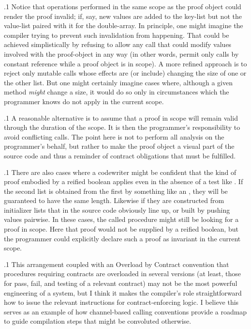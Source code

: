 \documentclass[11pt, twocolumn]{article}
\begin{document}
\p.1{%
Notice that operations performed in the same scope as
the proof object could render the proof invalid;
if, say, new values are added to the key-list but not
the value-list paired with it for the double-array. In
principle, one might imagine the compiler trying to
prevent such invalidation from happening. That could
be achieved simplistically by refusing to allow
any call that could modify values involved with the
proof-object in any way (in other words, permit
only calls by constant reference while a proof object
is in scope). A more refined approach is to reject
only mutable calls whose effects are (or include)
changing the size of one or the other list. But one
might certainly imagine cases where, although a given
method \textit{might} change a size, it would do so
only in circumstances which the programmer knows
do not apply in the current scope.
}%

\p.1{%
A reasonable alternative is to assume that a proof
in scope will remain valid through the duration of the
scope. It is then the programmer's responsibility
to avoid conflicting calls. The point here is not
to perform all analysis on the programmer's behalf, but
rather to make the proof object a visual part of
the source code and thus a reminder of contract
obligations that must be fulfilled.
}%

\p.1{%
There are also cases where a codewriter might be confident
that the kind of proof embodied by a reified boolean
applies even in the absence of a test like
. If the second list
is obtained from the first by something like an
, they will be guaranteed to have the
same length. Likewise if they are constructed from initializer
lists that in the source code obviously line up,
or built by pushing values pairwise. In these
cases, the called procedure might still be looking
for a proof in scope. Here that proof would not be
supplied by a reified boolean, but the programmer
could explicitly declare such a proof as invariant in the
current scope.
}%

\p.1{%
This arrangement \mdash{} coupled with an Overload by Contract
convention that procedures requiring contracts
are overloaded in several versions (at least, those for
pass, fail, and testing of a relevant contract) \mdash{} may
not be the most powerful engineering of a  system,
but I think it makes the compiler's role straightforward \mdash{}
how to issue the relevant
 instructions  for contract-enforcing logic. I believe this serves as an example of
how channel-based calling conventions provide a roadmap
to guide compilation steps that might be convoluted otherwise.\vspace{5pt}
}%
\end{document}
